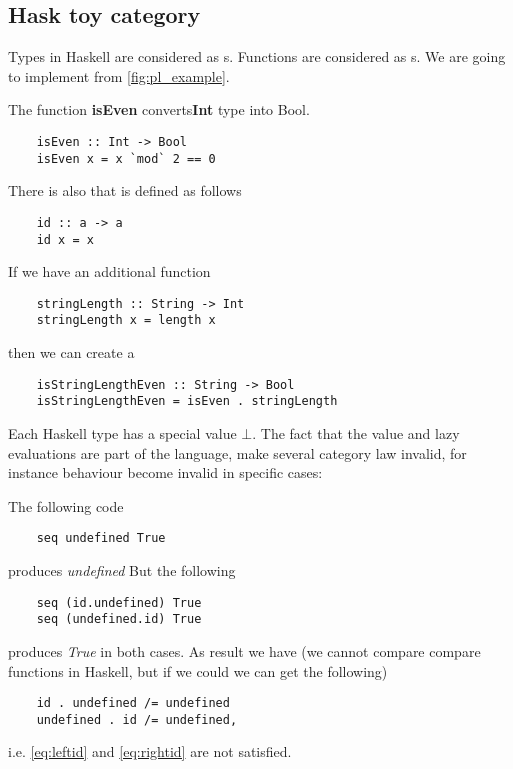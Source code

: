 \subsection{\textbf{Hask} toy category}
\begin{example}
  \label{ex:haskcategory}
  Types in Haskell are considered as s.
  Functions are considered as s.
  We are going to implement  from
  \cref{fig:pl_example}.

  The function \textbf{isEven}
  converts\textbf{Int} type 
  into Bool.
  \begin{verbatim}
    isEven :: Int -> Bool
    isEven x = x `mod` 2 == 0
  \end{verbatim}

  There is also  that is defined as follows
  \begin{verbatim}
    id :: a -> a
    id x = x
  \end{verbatim}

  If we have an additional function
  \begin{verbatim}
    stringLength :: String -> Int
    stringLength x = length x
  \end{verbatim}
  then we can create a 
  \begin{verbatim}
    isStringLengthEven :: String -> Bool
    isStringLengthEven = isEven . stringLength
  \end{verbatim}

\end{example}

\begin{remark}
  \label{rem:hask_lazy_eval}
  Each Haskell type has a special value $\bot$. The fact that the
  value and lazy evaluations are part of the language, make several
  category law invalid, for instance 
   behaviour become invalid in specific cases:

  The following code
  \begin{verbatim}
    seq undefined True
  \end{verbatim}
  produces \textit{undefined}
  But the following
  \begin{verbatim}
    seq (id.undefined) True
    seq (undefined.id) True
  \end{verbatim}
  produces \textit{True} in both cases.
  As result we have
  (we cannot compare compare functions in Haskell, but if we
  could we can get the following)
  \begin{verbatim}
    id . undefined /= undefined
    undefined . id /= undefined,
  \end{verbatim}
  i.e. \eqref{eq:leftid} and
  \eqref{eq:rightid} are not satisfied.  
\end{remark}

